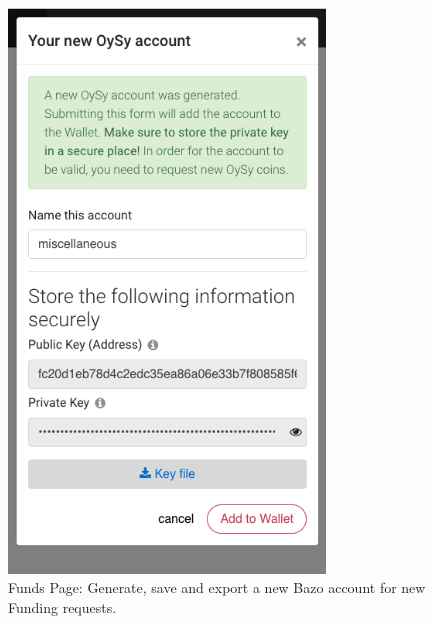 \begin{figure}
\centering
\includegraphics[width=0.75\textwidth]{screenshots/Funds-2.png}
\caption{\label{fig:uifunds2}Funds Page: Generate, save and export a new Bazo account for new Funding requests.}
\end{figure}

